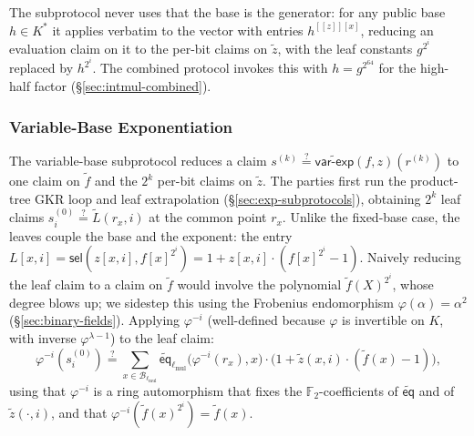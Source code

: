 \documentclass{article}
\theoremstyle{definition}
\newcommand*{\mle}{\widetilde}
\newcommand{\eq}{\mathsf{eq}}
\newcommand{\BB}{\mathcal{B}}
\newcommand{\FF}[1]{\mathbb{F}_{#1}}
\newcommand{\intval}[1]{[\![#1]\!]}
\newcommand{\sel}{\textsf{sel}}
\begin{document}
The subprotocol never uses that the base is the generator: for any public base $h \in K^*$ it applies verbatim to the vector with entries $h^{\intval{z}[x]}$, reducing an evaluation claim on it to the per-bit claims on $\mle{z}$, with the leaf constants $g^{2^i}$ replaced by $h^{2^i}$. The combined protocol invokes this with $h = g^{2^{64}}$ for the high-half factor (\S\ref{sec:intmul-combined}).

\subsubsection{Variable-Base Exponentiation}
\label{sec:var-base-exp}

The variable-base subprotocol reduces a claim $s^{(k)} \stackrel{?}{=} \mle{\textsf{var-exp}}(f, z)(r^{(k)})$ to one claim on $\mle{f}$ and the $2^k$ per-bit claims on $\mle{z}$. The parties first run the product-tree GKR loop and leaf extrapolation (\S\ref{sec:exp-subprotocols}), obtaining $2^k$ leaf claims $s^{(0)}_i \stackrel{?}{=} \mle{L}(r_x, i)$ at the common point $r_x$. Unlike the fixed-base case, the leaves couple the base and the exponent: the entry $L[x, i] = \sel(z[x, i], f[x]^{2^i}) = 1 + z[x, i] \cdot (f[x]^{2^i} - 1)$. Naively reducing the leaf claim to a claim on $\mle{f}$ would involve the polynomial $\mle{f}(X)^{2^i}$, whose degree blows up; we sidestep this using the Frobenius endomorphism $\varphi(\alpha) = \alpha^2$ (\S\ref{sec:binary-fields}). Applying $\varphi^{-i}$ (well-defined because $\varphi$ is invertible on $K$, with inverse $\varphi^{\lambda - 1}$) to the leaf claim:
\[
  \varphi^{-i}(s^{(0)}_i) \stackrel{?}{=} \sum_{x \in \BB_{\ell_\text{mul}}} \mle{\eq}_{\ell_\text{mul}}\bigl( \varphi^{-i}(r_x), x \bigr) \cdot \bigl( 1 + \mle{z}(x, i) \cdot (\mle{f}(x) - 1) \bigr),
\]
using that $\varphi^{-i}$ is a ring automorphism that fixes the $\FF{2}$-coefficients of $\mle{\eq}$ and of $\mle{z}(\cdot, i)$, and that $\varphi^{-i}(\mle{f}(x)^{2^i}) = \mle{f}(x)$.
\end{document}
